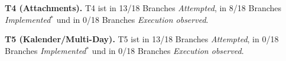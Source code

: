 \noindent \textbf{T4 (Attachments).} T4 ist in 13/18 Branches  \textit{Attempted}, in 8/18 Branches  \textit{Implemented$^\ast$} und in 0/18 Branches  \textit{Execution observed}.

\noindent \textbf{T5 (Kalender/Multi-Day).} T5 ist in 13/18 Branches  \textit{Attempted}, in 0/18 Branches  \textit{Implemented$^\ast$} und in 0/18 Branches  \textit{Execution observed}.

%

